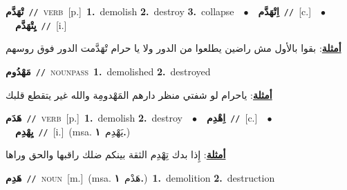 \documentclass[10pt,a4paper,twoside]{article} %
\begin{document}
\begin{multicols}{2}
{\setlength\topsep{0pt}\textbf{\foreignlanguage{arabic}{تْهَدَّم}}\ {\color{gray}\texttt{//}\color{black}}\ \textsc{verb}\ [p.]\ \textbf{1.}~demolish  \textbf{2.}~destroy  \textbf{3.}~collapse\ \ $\bullet$\ \ \setlength\topsep{0pt}\textbf{\foreignlanguage{arabic}{اِتْهَدَّم}}\ {\color{gray}\texttt{//}\color{black}}\ [c.]\ \ $\bullet$\ \ \setlength\topsep{0pt}\textbf{\foreignlanguage{arabic}{يِتْهَدَّم}}\ {\color{gray}\texttt{//}\color{black}}\ [i.]\  \begin{flushright}\color{gray}\foreignlanguage{arabic}{\textbf{\underline{\foreignlanguage{arabic}{أمثلة}}}: بقوا بالأول مش راضين يطلعوا من الدور ولا يا حرام تْهَدَّمت الدور فوق روسهم}\end{flushright}\color{black}} \vspace{2mm}

{\setlength\topsep{0pt}\textbf{\foreignlanguage{arabic}{مَهْدُوم}}\ {\color{gray}\texttt{//}\color{black}}\ \textsc{noun\textunderscore pass}\ \textbf{1.}~demolished  \textbf{2.}~destroyed\  \begin{flushright}\color{gray}\foreignlanguage{arabic}{\textbf{\underline{\foreignlanguage{arabic}{أمثلة}}}: ياحرام لو شفتي منظر دارهم المَهْدومِة والله غير يتقطع قلبك}\end{flushright}\color{black}} \vspace{2mm}

{\setlength\topsep{0pt}\textbf{\foreignlanguage{arabic}{هَدَم}}\ {\color{gray}\texttt{//}\color{black}}\ \textsc{verb}\ [p.]\ \textbf{1.}~demolish  \textbf{2.}~destroy\ \ $\bullet$\ \ \setlength\topsep{0pt}\textbf{\foreignlanguage{arabic}{اِهْدِم}}\ {\color{gray}\texttt{//}\color{black}}\ [c.]\ \ $\bullet$\ \ \setlength\topsep{0pt}\textbf{\foreignlanguage{arabic}{يِهْدِم}}\ {\color{gray}\texttt{//}\color{black}}\ [i.]\ \color{gray}(msa. \foreignlanguage{arabic}{يَهْدِم}~\foreignlanguage{arabic}{\textbf{١.}})\color{black}\  \begin{flushright}\color{gray}\foreignlanguage{arabic}{\textbf{\underline{\foreignlanguage{arabic}{أمثلة}}}: إِذا بدك تِهْدِم الثقة بينكم ضلك راقبها والحق وراها}\end{flushright}\color{black}} \vspace{2mm}

{\setlength\topsep{0pt}\textbf{\foreignlanguage{arabic}{هَدِم}}\ {\color{gray}\texttt{//}\color{black}}\ \textsc{noun}\ [m.]\ \color{gray}(msa. \foreignlanguage{arabic}{هَدْم}~\foreignlanguage{arabic}{\textbf{١.}})\color{black}\ \textbf{1.}~demolition  \textbf{2.}~destruction\ } \vspace{2mm}


\end{multicols}
\end{document}
